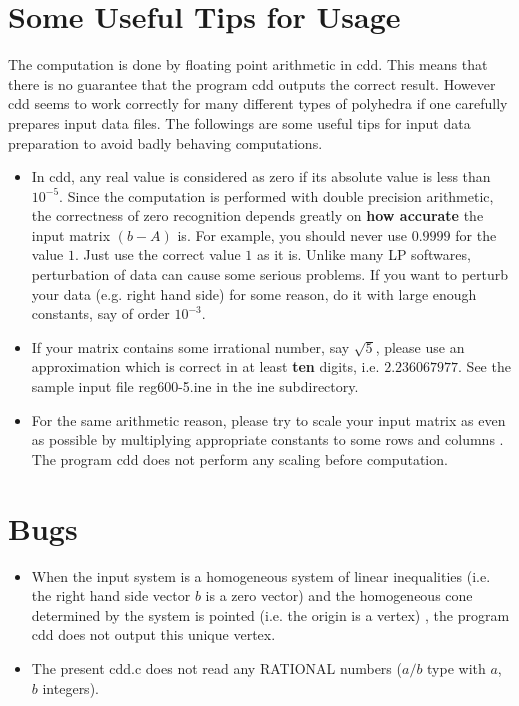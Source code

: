 \section{Some  Useful Tips for Usage}  \label{TIPS}

The computation is done by floating point arithmetic in cdd.  This means that
there is no guarantee that the program cdd outputs the correct result.  However cdd
seems to work correctly for many different types of polyhedra if one
carefully prepares input data files.   The followings
are some useful tips  for  input data preparation to 
avoid badly behaving computations.

\begin{itemize}

\item  In cdd, any real value is considered as zero if its absolute value is
less than $10^{-5}$.  Since the computation is performed with double precision
arithmetic, the correctness of zero recognition depends greatly on {\bf how
accurate\/} the input matrix $(b- A)$ is.  For example, you should never use
$0.9999$ for the value $1$.  Just use the correct value $1$ as it is.
Unlike many LP softwares, perturbation of data
can cause some serious problems.  If you want to perturb your data (e.g. right
hand side) for some reason, do it with large enough constants, say of order
$10^{-3}$.


\item If your matrix contains some irrational number, say
$\sqrt{5}$, please use an approximation which is correct in at least {\bf ten\/} digits,
i.e.  $2.236067977$.   See the sample input file  reg600-5.ine in the ine subdirectory.
 
\item  For the same arithmetic reason, please try to scale your input matrix
as even as possible by multiplying appropriate constants to some rows and
columns .   The program cdd does not perform any scaling before
computation.

\end{itemize}

\section{Bugs}  \label{BUGS}
\begin{itemize}

\item When the input system is a homogeneous system of linear inequalities
(i.e. the right hand side vector $b$ is a zero vector) and the homogeneous
cone determined by the system is pointed (i.e. the origin is a vertex) , 
the program cdd does not output this unique vertex.

\item The present cdd.c does not
read any RATIONAL numbers ($a/b$ type with $a$, $b$ integers).

\end{itemize}

